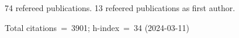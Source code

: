 74 refereed publications. 13 refeered publications as first author.

Total citations~=~3901; h-index~=~34 (2024-03-11)